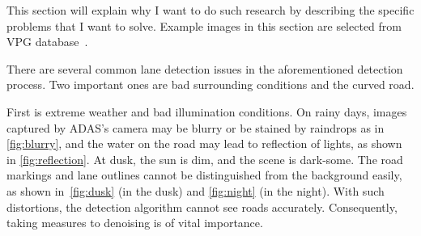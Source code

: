 \begin{spacing}{1.5}
This section will explain why I want to do such research by describing the specific problems that I want to solve. Example images in this section are selected from VPG database~\cite{lee2017vpgnet}.

There are several common lane detection issues in the aforementioned detection process. Two important ones are bad surrounding conditions and the curved road.

First is extreme weather and bad illumination conditions. On rainy days, images captured by ADAS’s camera may be blurry or be stained by raindrops as in \autoref{fig:blurry}, and the water on the road may lead to reflection of lights, as shown in \autoref{fig:reflection}. At dusk, the sun is dim, and the scene is dark-some. The road markings and lane outlines cannot be distinguished from the background easily, as shown in~\autoref{fig:dusk} (in the dusk) and \autoref{fig:night} (in the night). With such distortions, the detection algorithm cannot see roads accurately. Consequently, taking measures to denoising is of vital importance. 



\end{spacing}

